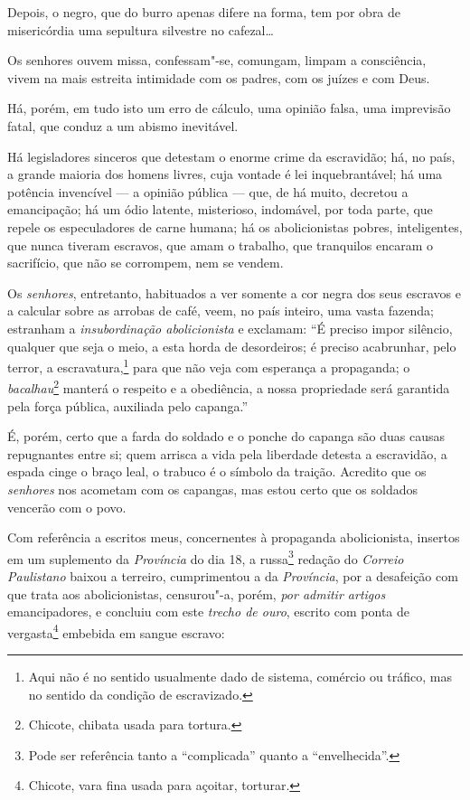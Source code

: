 Depois, o negro, que do burro apenas difere na forma, tem por obra de
misericórdia uma sepultura silvestre no cafezal\ldots{}

Os senhores ouvem missa, confessam"-se, comungam, limpam a consciência,
vivem na mais estreita intimidade com os padres, com os juízes e com
Deus.

Há, porém, em tudo isto um erro de cálculo, uma opinião falsa, uma
imprevisão fatal, que conduz a um abismo inevitável.

Há legisladores sinceros que detestam o enorme crime da escravidão; há,
no país, a grande maioria dos homens livres, cuja vontade é lei
inquebrantável; há uma potência invencível --- a opinião pública ---
que, de há muito, decretou a emancipação; há um ódio latente,
misterioso, indomável, por toda parte, que repele os especuladores de
carne humana; há os abolicionistas pobres, inteligentes, que nunca
tiveram escravos, que amam o trabalho, que tranquilos encaram o
sacrifício, que não se corrompem, nem se vendem.

Os \emph{senhores}, entretanto, habituados a ver somente a cor negra dos
seus escravos e a calcular sobre as arrobas de café, veem, no país
inteiro, uma vasta fazenda; estranham a \emph{insubordinação
abolicionista} e exclamam: ``É preciso impor silêncio, qualquer que seja
o meio, a esta horda de desordeiros; é preciso acabrunhar, pelo terror,
a escravatura,\footnote{Aqui não é no sentido usualmente dado de
  sistema, comércio ou tráfico, mas no sentido da condição de
  escravizado.} para que não veja com esperança a propaganda; o
\emph{bacalhau}\footnote{Chicote, chibata usada para tortura.} manterá
o respeito e a obediência, a nossa propriedade será garantida pela força
pública, auxiliada pelo capanga.''

É, porém, certo que a farda do soldado e o ponche do capanga são duas
causas repugnantes entre si; quem arrisca a vida pela liberdade detesta
a escravidão, a espada cinge o braço leal, o trabuco é o símbolo da
traição. Acredito que os \emph{senhores} nos acometam com os capangas,
mas estou certo que os soldados vencerão com o povo.

Com referência a escritos meus, concernentes à propaganda abolicionista,
insertos em um suplemento da \emph{Província} do dia 18, a
russa\footnote{Pode ser referência tanto a ``complicada'' quanto a
  ``envelhecida''.} redação do \emph{Correio Paulistano} baixou a terreiro,
cumprimentou a da \emph{Província}, por a desafeição com que trata aos
abolicionistas, censurou"-a, porém, \emph{por admitir artigos}
emancipadores, e concluiu com este \emph{trecho de ouro}, escrito com
ponta de vergasta\footnote{Chicote, vara fina usada para açoitar,
  torturar.} embebida em sangue escravo:

